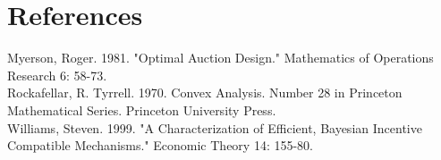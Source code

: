 \documentclass[10pt]{article}
\begin{document}
\section*{References}
Myerson, Roger. 1981. "Optimal Auction Design." Mathematics of Operations Research 6: 58-73.\\
Rockafellar, R. Tyrrell. 1970. Convex Analysis. Number 28 in Princeton Mathematical Series. Princeton University Press.\\
Williams, Steven. 1999. "A Characterization of Efficient, Bayesian Incentive Compatible Mechanisms." Economic Theory 14: 155-80.
\end{document}
